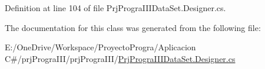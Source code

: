 Definition at line 104 of file Prj\+Progra\+I\+I\+I\+Data\+Set.\+Designer.\+cs.



The documentation for this class was generated from the following file\+:\begin{DoxyCompactItemize}
\item 
E\+:/\+One\+Drive/\+Workspace/\+Proyecto\+Progra/\+Aplicacion C\#/prj\+Progra\+I\+I\+I/prj\+Progra\+I\+I\+I/\hyperlink{_prj_progra_i_i_i_data_set_8_designer_8cs}{Prj\+Progra\+I\+I\+I\+Data\+Set.\+Designer.\+cs}\end{DoxyCompactItemize}
